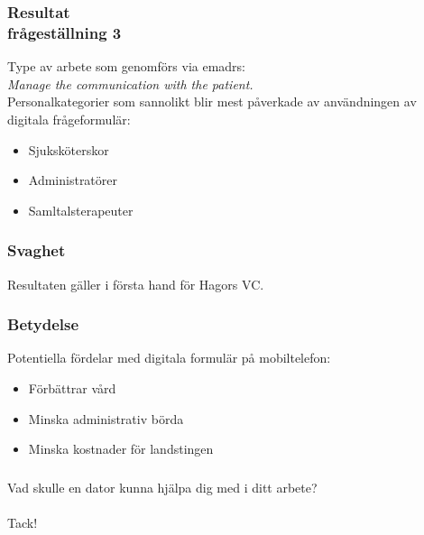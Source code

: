 \documentclass[english]{beamer}
\begin{document}
\begin{frame}
\frametitle{Resultat\\fr{\aa}gest{\"a}llning 3}
Type av arbete som genomf{\"o}rs via e{\sc madrs}:\\
{\it Manage the communication with the patient.}\\
Personalkategorier som sannolikt blir mest p{\aa}verkade av anv{\"a}ndningen av digitala fr{\aa}geformul{\"a}r:
\begin{itemize}\vspace{-.33em}
\item Sjuksk{\"o}terskor
\item Administrat{\"o}rer
\item Samltalsterapeuter

\end{itemize}
\end{frame}


\begin{frame}
\frametitle{Svaghet}
Resultaten g{\"a}ller i f{\"o}rsta hand f{\"o}r Hagors VC.
\end{frame}


\begin{frame}
\frametitle{Betydelse}
Potentiella f{\"o}rdelar med digitala formul{\"a}r p{\aa} mobiltelefon:
\begin{itemize}\vspace{-.33em}
\item F{\"o}rb{\"a}ttrar v{\aa}rd
\item Minska administrativ b{\"o}rda
\item Minska kostnader f{\"o}r landstingen
\end{itemize}
\end{frame}

\begin{frame}
\frametitle{}
Vad skulle en dator kunna hj{\"a}lpa dig med i ditt arbete?\\\ \\
Tack!
\end{frame}
\end{document}
